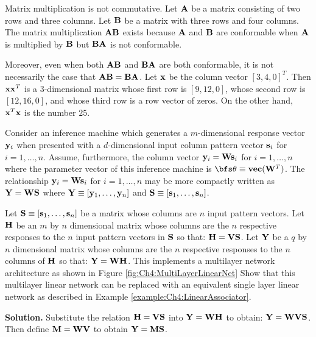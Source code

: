 Matrix multiplication is not commutative. Let ${\bf A}$ be a matrix consisting of
two rows and three columns. Let ${\bf B}$ be a matrix with three rows and four
columns. The matrix multiplication ${\bf A}{\bf B}$ exists because 
${\bf A}$ and ${\bf B}$ are conformable when ${\bf A}$ is multiplied by ${\bf B}$
but ${\bf B} {\bf A}$ is not conformable.

Moreover, even when both ${\bf A}{\bf B}$ and ${\bf B}{\bf A}$ are both conformable,
it is not necessarily the case that ${\bf A}{\bf B} = {\bf B}{\bf A}$.
Let ${\bf x}$ be the column vector $[3, 4, 0]^T$. Then ${\bf x} {\bf x}^T$ is a
$3$-dimensional matrix whose first row is $[9, 12, 0]$, whose second row is
$[12, 16, 0]$, and whose third row is a row vector of zeros. On the other hand,
${\bf x}^T {\bf x}$ is the number $25$. 

\begin{example}
\label{example:Ch4:LinearAssociator}
Consider an inference machine which generates a $m$-dimensional response
vector ${\bf y}_i$ when presented with a $d$-dimensional input column pattern vector
${\bf s}_i$ for $i = 1, \ldots, n$. Assume, furthermore, the column vector 
${\bf y}_i = {\bf W} {\bf s}_i$ for $i = 1, \ldots, n$ where the parameter
vector of this inference machine is ${\bfs \theta} \equiv {\bf vec}({\bf W}^T)$.
The relationship
${\bf y}_i = {\bf W} {\bf s}_i$ for $i = 1, \ldots, n$ may be more compactly
written as ${\bf Y} = {\bf W} {\bf S}$
where ${\bf Y} \equiv [{\bf y}_1, \ldots, {\bf y}_n]$ and
${\bf S} \equiv [{\bf s}_1, \ldots, {\bf s}_n]$.
\end{example}

\begin{example}
Let ${\bf S} \equiv [{\bf s}_1, \ldots, {\bf s}_n]$ be a matrix whose columns are $n$
input pattern vectors. Let ${\bf H}$ be an $m$ by $n$ dimensional
matrix whose columns are the $n$ respective responses to the $n$ input pattern vectors in ${\bf S}$
so that:
${\bf H} = {\bf V} {\bf S}$.
Let ${\bf Y}$ be a $q$ by $n$ dimensional matrix whose columns are the $n$ respective responses
to the $n$ columns of ${\bf H}$ so that:
${\bf Y} = {\bf W} {\bf H}$.
This implements a multilayer network architecture as shown in Figure \ref{fig:Ch4:MultiLayerLinearNet}
Show that this multilayer linear network can be replaced with an equivalent single layer linear network
as described in Example \ref{example:Ch4:LinearAssociator}.

{\bf Solution.}
Substitute the relation ${\bf H} = {\bf V} {\bf S}$ into
${\bf Y} = {\bf W} {\bf H}$ to obtain:
${\bf Y} = {\bf W} {\bf V} {\bf S}$. Then define ${\bf M} = {\bf W} {\bf V}$ to obtain
${\bf Y} = {\bf M} {\bf S}$.
\end{example}


